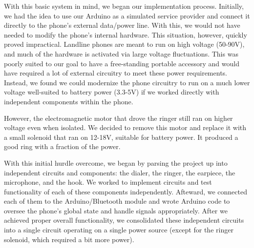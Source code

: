\documentclass{es50report}
\begin{document}
        With this basic system in mind, we began our implementation process. Initially, we had the idea to use our Arduino as a simulated service provider and connect it directly to the phone's external data/power line. With this, we would not have needed to modify the phone's internal hardware. This situation, however, quickly proved impractical. Landline phones are meant to run on high voltage (50-90V), and much of the hardware is activated via large voltage fluctuations. This was poorly suited to our goal to have a free-standing portable accessory and would have required a lot of external circuitry to meet these power requirements. Instead, we found we could modernize the phone circuitry to run on a much lower voltage well-suited to battery power (3.3-5V) if we worked directly with independent components within the phone.

        However, the electromagnetic motor that drove the ringer still ran on higher voltage even when isolated. We decided to remove this motor and replace it with a small solenoid that ran on 12-18V, suitable for battery power. It produced a good ring with a fraction of the power.

        With this initial hurdle overcome, we began by parsing the project up into independent circuits and components: the dialer, the ringer, the earpiece, the microphone, and the hook. We worked to implement circuits and test functionality of each of these components independently. Afteward, we connected each of them to the Arduino/Bluetooth module and wrote Arduino code to oversee the phone's global state and handle signals appropriately. After we achieved proper overall functionality, we consolidated these independent circuits into a single circuit operating on a single power source (except for the ringer solenoid, which required a bit more power).
\end{document}
